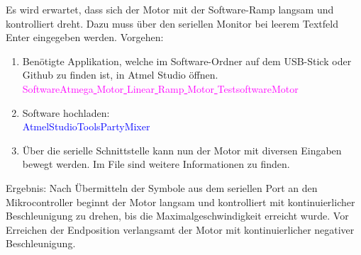 Es wird erwartet, dass sich der Motor mit der Software-Ramp langsam und kontrolliert dreht. Dazu muss über den seriellen Monitor bei leerem Textfeld Enter eingegeben werden.
\newpage
Vorgehen:
\begin{enumerate}
\item Benötigte Applikation, welche im Software-Ordner auf dem USB-Stick oder Github \cite{aebi_projekt-6softwareatmega_2020} zu finden ist, in Atmel Studio öffnen.\\
\textcolor{magenta}{Software\textrightarrow Atmega\underline{ }Motor\underline{ }Linear\underline{ }Ramp\underline{ }Motor\underline{ }Testsoftware\textrightarrow Motor}\\

\item Software hochladen:\\
\textcolor{blue}{AtmelStudio\textrightarrow Tools\textrightarrow PartyMixer}\\

\item Über die serielle Schnittstelle kann nun der Motor mit diversen Eingaben bewegt werden. Im File sind weitere Informationen zu finden.

\end{enumerate}

Ergebnis: Nach Übermitteln der Symbole aus dem seriellen Port an den Mikrocontroller beginnt der Motor langsam und kontrolliert mit kontinuierlicher Beschleunigung zu drehen, bis die Maximalgeschwindigkeit erreicht wurde. Vor Erreichen der Endposition verlangsamt der Motor mit kontinuierlicher negativer Beschleunigung.